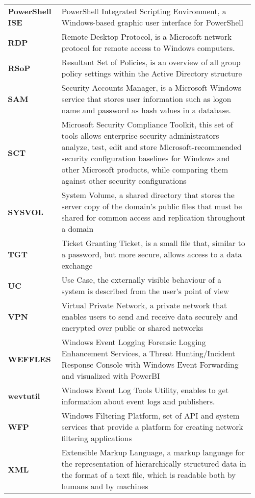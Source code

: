 \begin{longtable}{ p{4cm}  p{12cm} }
    \textbf{PowerShell ISE} & PowerShell Integrated Scripting Environment, a Windows-based graphic user interface for PowerShell\\
    \textbf{RDP} & Remote Desktop Protocol, is a Microsoft network protocol for remote access to Windows computers.\\
    \textbf{RSoP} & Resultant Set of Policies, is an overview of all group policy settings within the Active Directory structure\\
    \textbf{SAM} & Security Accounts Manager, is a Microsoft Windows service that stores user information such as logon name and password as hash values in a database.\\
    \textbf{SCT} & Microsoft Security Compliance Toolkit, this set of tools allows enterprise security administrators analyze, test, edit and store Microsoft-recommended security configuration baselines for Windows and other Microsoft products, while comparing them against other security configurations\\
    \textbf{SYSVOL} & System Volume, a shared directory that stores the server copy of the domain's public files that must be shared for common access and replication throughout a domain\\
    \textbf{TGT} & Ticket Granting Ticket, is a small file that, similar to a password, but more secure, allows access to a data exchange\\
    \textbf{UC} & Use Case, the externally visible behaviour of a system is described from the user's point of view\\
    \textbf{VPN} & Virtual Private Network, a private network that enables users to send and receive data securely and encrypted over public or shared networks\\
    \textbf{WEFFLES} & Windows Event Logging Forensic Logging Enhancement Services, a Threat Hunting/Incident Response Console with Windows Event Forwarding and visualized with PowerBI\\
    \textbf{wevtutil} & Windows Event Log Tools Utility, enables to get information about event logs and publishers. \\
    \textbf{WFP} & Windows Filtering Platform,  set of API and system services that provide a platform for creating network filtering applications\\
    \textbf{XML} & Extensible Markup Language,  a markup language for the representation of hierarchically structured data in the format of a text file, which is readable both by humans and by machines\\
\end{longtable}